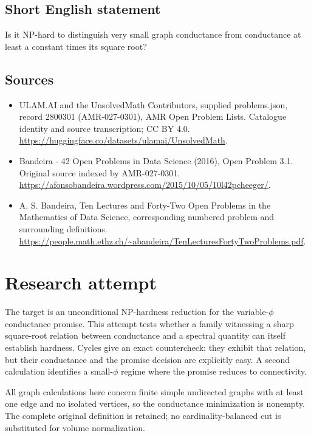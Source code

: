 \documentclass[11pt,a4paper]{article}
\begin{document}
\subsection{Short English statement}
Is it NP-hard to distinguish very small graph conductance from conductance at least a constant times its square root?
\subsection{Sources}
\begin{itemize}
\item[S1] ULAM.AI and the UnsolvedMath Contributors, supplied problems.json, record 2800301 (AMR-027-0301), AMR Open Problem Lists. Catalogue identity and source transcription; CC BY 4.0.
\url{https://huggingface.co/datasets/ulamai/UnsolvedMath}.
\item[S2] Bandeira - 42 Open Problems in Data Science (2016), Open Problem 3.1. Original source indexed by AMR-027-0301.
\url{https://afonsobandeira.wordpress.com/2015/10/05/10l42pcheeger/}.
\item[S3] A. S. Bandeira, Ten Lectures and Forty-Two Open Problems in the Mathematics of Data Science, corresponding numbered problem and surrounding definitions.
\url{https://people.math.ethz.ch/~abandeira/TenLecturesFortyTwoProblems.pdf}.
\end{itemize}


\section{Research attempt}
The target is an unconditional NP-hardness reduction for the variable-$\phi$ conductance promise. This attempt tests whether a family witnessing a sharp square-root relation between conductance and a spectral quantity can itself establish hardness. Cycles give an exact countercheck: they exhibit that relation, but their conductance and the promise decision are explicitly easy. A second calculation identifies a small-$\phi$ regime where the promise reduces to connectivity.

All graph calculations here concern finite simple undirected graphs with at least one edge and no isolated vertices, so the conductance minimization is nonempty. The complete original definition is retained; no cardinality-balanced cut is substituted for volume normalization.
\end{document}
